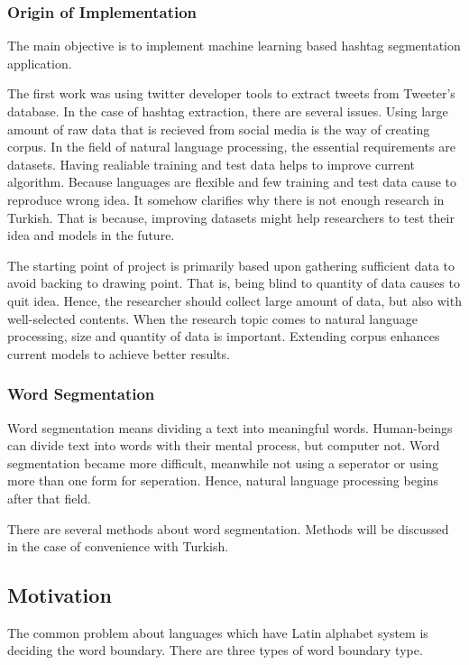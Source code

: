 \documentclass[12pt]{comjnl}
\begin{document}
\subsubsection{Origin of Implementation}
The main objective is to implement machine learning based hashtag segmentation application.

The first work was using twitter developer tools to extract tweets from Tweeter's database. In the case of hashtag extraction, there are several issues. Using large amount of raw data that 
is recieved from social media is the way of creating corpus. In the field of natural language 
processing, the essential requirements are datasets. Having realiable training and test data helps to improve
current algorithm. Because languages are flexible and few training and test data cause to 
reproduce wrong idea. It somehow clarifies why there is not enough
research in Turkish. That is because, improving datasets might help researchers to test their idea and
models in the future. 

The starting point of project is primarily based upon gathering sufficient data to avoid
backing to drawing point. That is, being blind to quantity of data causes to quit idea. Hence, the researcher should collect large amount of data, but also with well-selected contents. When the research topic comes to natural language processing, size and quantity of data is important. Extending corpus enhances current models to achieve better results.

\subsubsection{Word Segmentation}
Word segmentation means dividing a text into meaningful words. Human-beings can divide text into words with their mental process, but computer not. Word segmentation became more difficult, meanwhile not using a seperator or using more than one form for seperation. Hence, natural language processing begins after that field.

There are several methods about word segmentation. Methods will be discussed in the case of convenience with Turkish.

\subsection{Motivation}
The common problem about languages which have Latin alphabet system is deciding the word boundary. There are three types of word boundary type.
\end{document}
